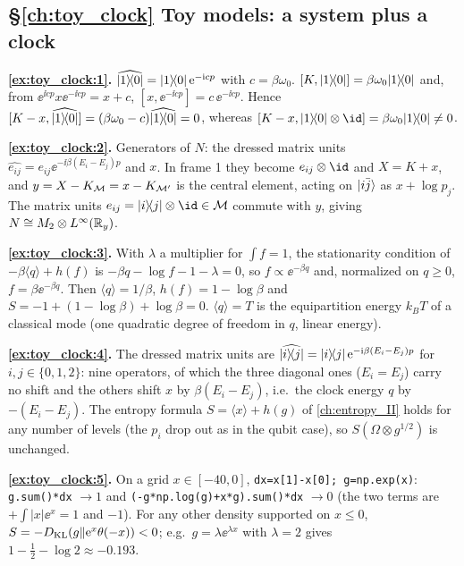 {\subsection*{\S\ref{ch:toy_clock} Toy models: a system plus a clock}
\textbf{\ref{ex:toy_clock:1}.} $\widehat{\lvert 1\rangle\!\langle 0\rvert}=\lvert 1\rangle\!\langle 0\rvert\,\mathrm{e}^{-\mathrm{i} cp}$ with $c=\beta\omega_0$. $[K,\lvert 1\rangle\!\langle 0\rvert]=\beta\omega_0\lvert 1\rangle\!\langle 0\rvert$ and, from $\ee^{\ii cp}x\ee^{-\ii cp}=x+c$, $[x,\ee^{-\ii cp}]=c\,\ee^{-\ii cp}$. Hence $[K-x,\widehat{\lvert 1\rangle\!\langle 0\rvert}]=(\beta\omega_0-c)\widehat{\lvert 1\rangle\!\langle 0\rvert}=0$, whereas $[K-x,\ket1\!\bra0\otimes\id]=\beta\omega_0\ket1\!\bra0\ne0$.\par
\textbf{\ref{ex:toy_clock:2}.} Generators of $N$: the dressed matrix units $\widehat{e_{ij}}=e_{ij}\ee^{-\ii\beta(E_i-E_j)p}$ and $x$. In frame 1 they become $e_{ij}\otimes\id$ and $X=K+x$, and $y=X-K_{\mathcal{M}}=x-K_{\mathcal{M}'}$ is the central element, acting on $\lvert i\bar j\rangle$ as $x+\log p_j$. The matrix units $e_{ij}=\ket i\!\bra j\otimes\id\in\M$ commute with $y$, giving $N\cong M_2\otimes L^\infty(\mathbb{R}_y)$.\par
\textbf{\ref{ex:toy_clock:3}.} With $\lambda$ a multiplier for $\int f=1$, the stationarity condition of $-\beta\langle q\rangle+h(f)$ is $-\beta q-\log f-1-\lambda=0$, so $f\propto\ee^{-\beta q}$ and, normalized on $q\ge0$, $f=\beta\ee^{-\beta q}$. Then $\langle q\rangle=1/\beta$, $h(f)=1-\log\beta$ and $S=-1+(1-\log\beta)+\log\beta=0$. $\langle q\rangle=T$ is the equipartition energy $k_BT$ of a classical mode (one quadratic degree of freedom in $q$, linear energy).\par
\textbf{\ref{ex:toy_clock:4}.} The dressed matrix units are $\widehat{\lvert i\rangle\!\langle j\rvert}=\lvert i\rangle\!\langle j\rvert\,\mathrm{e}^{-\mathrm{i}\beta(E_i-E_j)p}$ for $i,j\in\{0,1,2\}$: nine operators, of which the three diagonal ones ($E_i=E_j$) carry no shift and the others shift $x$ by $\beta(E_i-E_j)$, i.e.\ the clock energy $q$ by $-(E_i-E_j)$. The entropy formula $S=\langle x\rangle+h(g)$ of \cref{ch:entropy_II} holds for any number of levels (the $p_i$ drop out as in the qubit case), so $S(\Omega\otimes g^{1/2})$ is unchanged.\par
\textbf{\ref{ex:toy_clock:5}.} On a grid $x\in[-40,0]$, \texttt{dx=x[1]-x[0]; g=np.exp(x)}: \texttt{g.sum()*dx} $\to1$ and \texttt{(-g*np.log(g)+x*g).sum()*dx} $\to0$ (the two terms are $+\!\int|x|\ee^x=1$ and $-1$). For any other density supported on $x\le0$, $S=-D_{\rm KL}(g\|\mathrm{e}^{x}\theta(-x))<0$; e.g.\ $g=\lambda\ee^{\lambda x}$ with $\lambda=2$ gives $1-\frac12-\log2\approx-0.193$.\par

}

